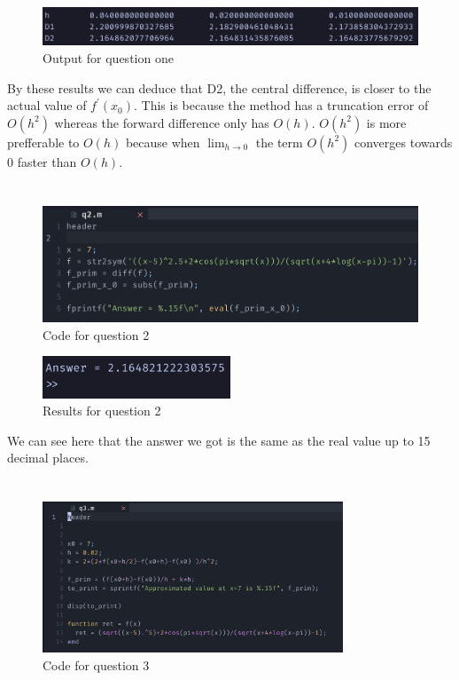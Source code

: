 \documentclass{article}
\begin{document}
\begin{figure}[h]
	\centering
	\includegraphics[width=\textwidth]{imgs/q1_results.png}
	\caption{Output for question one}
	\label{fig:q1_results}
\end{figure}

By these results we can deduce that D2, the central difference, is closer to the actual value of $f^\prime(x_0)$. This is because the method has a
truncation error of $O(h^2)$ whereas the forward difference only has $O(h)$. $O(h^{2})$ is more prefferable to $O(h)$ because when $\lim_{h \to 0}$ the term $O(h^{2})$ converges towards $0$ faster than $O(h)$.

\newpage
\section{}
\begin{figure}[H]
	\centering
	\includegraphics[width=\textwidth{}]{imgs/q2_code.png}
	\caption{Code for question 2}
	\label{fig:q2_code}
\end{figure}

\begin{figure}[H]
	\centering
	\includegraphics[width=0.5\textwidth]{imgs/q2_results.png}
	\caption{Results for question 2}
	\label{fig:q2_results}
\end{figure}

We can see here that the answer we got is the same as the real value up to 15 decimal places.

\newpage
\section{}
\begin{figure}[H]
	\centering
	\includegraphics[width=0.8\textwidth]{imgs/q3_code.png}
	\caption{Code for question 3}
	\label{fig:q3_code}
\end{figure}
\end{document}
